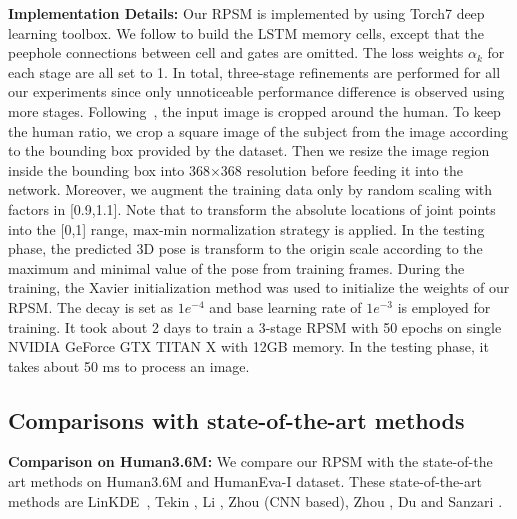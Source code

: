 \documentclass[10pt,twocolumn,letterpaper]{article}
\begin{document}
\textbf{Implementation Details:}
Our RPSM is implemented by using Torch7 \cite{collobert2011torch7} deep learning toolbox. We follow \cite{graves2014towards} to build the LSTM memory cells, except that the peephole connections between cell and gates are omitted. The loss weights $\alpha_k$ for each stage are all set to 1. In total, three-stage refinements are performed for all our experiments since only unnoticeable performance difference is observed using more stages. 
Following~\cite{zhou2015sparseness,li2015maximum}, the input image is cropped around the human. To keep the human ratio, we crop a square image of the subject from the image according to the bounding box provided by the dataset. 
Then we resize the image region inside the bounding box into 368$\times$368 resolution before feeding it into the network. Moreover, we augment the training data only by random scaling with factors in [0.9,1.1]. Note that to transform the absolute locations of joint points into the [0,1] range, $\text{max-min}$ normalization strategy is applied. In the testing phase, the predicted 3D pose is transform to the origin scale according to the maximum and minimal value of the pose from training frames. During the training, the Xavier initialization method \cite{glorot2010understanding} was used to initialize the weights of our RPSM. The decay is set as $1e^{-4}$ and base learning rate of $1e^{-3}$ is employed for training. It took about 2 days to train a 3-stage RPSM with 50 epochs on single NVIDIA GeForce GTX TITAN X with 12GB memory. In the testing phase, it takes about 50 ms to process an image.



\subsection{Comparisons with state-of-the-art methods}



\textbf{Comparison on Human3.6M:}
\label{section:human3.6m_result}
We compare our RPSM with the state-of-the art methods on Human3.6M \cite{huamn3.6m} and HumanEva-I \cite{sigal2010humaneva} dataset. These state-of-the-art methods are LinKDE~\cite{huamn3.6m}, Tekin \etal \cite{Tekin_2016_CVPR}, Li \etal \cite{li2015maximum}, Zhou \etal \cite{zhou2015sparseness} (CNN based), Zhou \etal \cite{zhou2016deep}, Du \etal \cite{DBLP:conf/eccv/DuWLHGWKG16} and Sanzari \etal \cite{DBLP:conf/eccv/SanzariNP16}. 
\end{document}
